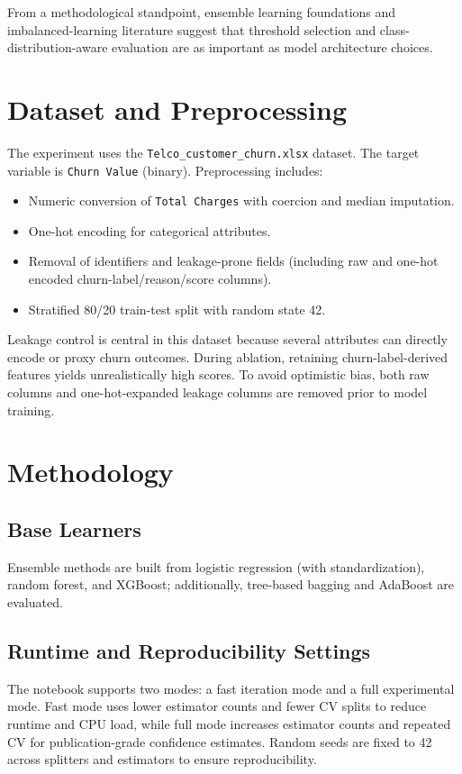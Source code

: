 \documentclass[conference]{IEEEtran}
\begin{document}
From a methodological standpoint, ensemble learning foundations \cite{zhou2012ensemble} and imbalanced-learning literature \cite{he2009imbalanced,chawla2002smote} suggest that threshold selection and class-distribution-aware evaluation are as important as model architecture choices.

\section{Dataset and Preprocessing}
The experiment uses the \texttt{Telco\_customer\_churn.xlsx} dataset. The target variable is \texttt{Churn Value} (binary). Preprocessing includes:
\begin{itemize}
\item Numeric conversion of \texttt{Total Charges} with coercion and median imputation.
\item One-hot encoding for categorical attributes.
\item Removal of identifiers and leakage-prone fields (including raw and one-hot encoded churn-label/reason/score columns).
\item Stratified 80/20 train-test split with random state 42.
\end{itemize}

Leakage control is central in this dataset because several attributes can directly encode or proxy churn outcomes. During ablation, retaining churn-label-derived features yields unrealistically high scores. To avoid optimistic bias, both raw columns and one-hot-expanded leakage columns are removed prior to model training.

\section{Methodology}
\subsection{Base Learners}
Ensemble methods are built from logistic regression (with standardization), random forest, and XGBoost; additionally, tree-based bagging and AdaBoost are evaluated.

\subsection{Runtime and Reproducibility Settings}
The notebook supports two modes: a fast iteration mode and a full experimental mode. Fast mode uses lower estimator counts and fewer CV splits to reduce runtime and CPU load, while full mode increases estimator counts and repeated CV for publication-grade confidence estimates. Random seeds are fixed to 42 across splitters and estimators to ensure reproducibility.
\end{document}
